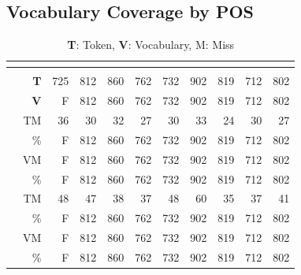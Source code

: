 \subsection{Vocabulary Coverage by POS}
\begin{table}
    \centering
    \begin{ThreePartTable}
        
    \begin{tabularx}{\textwidth}{L *{10}{R}}
     \\
    \toprule
    &  &  \\
    \toprule
     & \textbf{T} & 725 & 812 & 860 & 762 & 732 & 902 & 819 & 712 & 802 \\
    & \textbf{V} & F & 812 & 860 & 762 & 732 & 902 & 819 & 712 & 802 \\
    \midrule
     & TM & 36 & 30 & 32 & 27 & 30 & 33 & 24 & 30 & 27 \\
    & \% & F & 812 & 860 & 762 & 732 & 902 & 819 & 712 & 802 \\
    & VM & F & 812 & 860 & 762 & 732 & 902 & 819 & 712 & 802 \\
    & \% & F & 812 & 860 & 762 & 732 & 902 & 819 & 712 & 802 \\
    \midrule
     & TM & 48 & 47 & 38 & 37 & 48 & 60 & 35  & 37 & 41 \\
    & \% & F & 812 & 860 & 762 & 732 & 902 & 819 & 712 & 802 \\
    & VM & F & 812 & 860 & 762 & 732 & 902 & 819 & 712 & 802 \\
    & \% & F & 812 & 860 & 762 & 732 & 902 & 819 & 712 & 802 \\
    \bottomrule
    \end{tabularx}
    \end{ThreePartTable}
    \caption[The Little Prince Vocabulary Coverage in Semantic Spaces]{\textbf{T}: Token, \textbf{V}: Vocabulary, M: Miss\label{apptab:lppcoverage}}
    \end{table}

